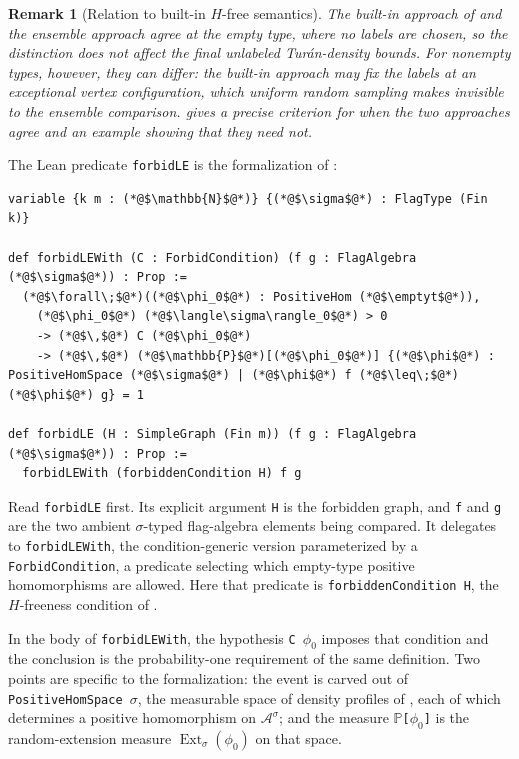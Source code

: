 \documentclass[acmsmall,screen=true,acmthm=false]{acmart}
\newtheorem{remark}[remark]{Remark}
\DeclareRobustCommand{\lean}[1]{{\def\_{\textunderscore\allowbreak}\texttt{#1}}}
\newcommand{\emptyt}{\emptyset_{\mathrm{t}}}
\newcommand{\Ext}{\operatorname{Ext}}
\begin{document}
\begin{remark}[Relation to built-in \(H\)-free semantics]\label{rem:builtin-hfree}
The built-in approach of  and the ensemble approach agree
at the empty type, where no labels are chosen, so the distinction does not
affect the final unlabeled Tur\'an-density bounds.  For nonempty types,
however, they can differ: the built-in approach may fix the labels at an
exceptional vertex configuration, which uniform random sampling makes
invisible to the ensemble comparison.
 gives a precise criterion for when the two approaches
agree and an example showing that they need not.
\end{remark}

The Lean predicate \lean{forbidLE} is the formalization of
:
\begin{lstlisting}
variable {k m : (*@$\mathbb{N}$@*)} {(*@$\sigma$@*) : FlagType (Fin k)}

def forbidLEWith (C : ForbidCondition) (f g : FlagAlgebra (*@$\sigma$@*)) : Prop :=
  (*@$\forall\;$@*)((*@$\phi_0$@*) : PositiveHom (*@$\emptyt$@*)),
    (*@$\phi_0$@*) (*@$\langle\sigma\rangle_0$@*) > 0
    -> (*@$\,$@*) C (*@$\phi_0$@*)
    -> (*@$\,$@*) (*@$\mathbb{P}$@*)[(*@$\phi_0$@*)] {(*@$\phi$@*) : PositiveHomSpace (*@$\sigma$@*) | (*@$\phi$@*) f (*@$\leq\;$@*)(*@$\phi$@*) g} = 1

def forbidLE (H : SimpleGraph (Fin m)) (f g : FlagAlgebra (*@$\sigma$@*)) : Prop :=
  forbidLEWith (forbiddenCondition H) f g
\end{lstlisting}
Read \lean{forbidLE} first.  Its explicit argument \lean{H} is the forbidden
graph, and \lean{f} and \lean{g} are the two ambient \(\sigma\)-typed
flag-algebra elements being compared.  It delegates to \lean{forbidLEWith}, the
condition-generic version parameterized by a \lean{ForbidCondition}, a
predicate selecting which empty-type positive homomorphisms are allowed.  Here
that predicate is \lean{forbiddenCondition H}, the \(H\)-freeness condition of
.

In the body of \lean{forbidLEWith}, the hypothesis \lean{C $\phi_0$} imposes
that condition and the conclusion is the probability-one requirement of the
same definition.  Two points are specific to the formalization: the event is
carved out of \lean{PositiveHomSpace $\sigma$}, the measurable space of density
profiles of , each of which determines a positive
homomorphism on \(\mathcal{A}^\sigma\); and the measure
\lean{$\mathbb{P}$[$\phi_0$]} is the random-extension measure
\(\Ext_\sigma(\phi_0)\) on that space.
\end{document}
